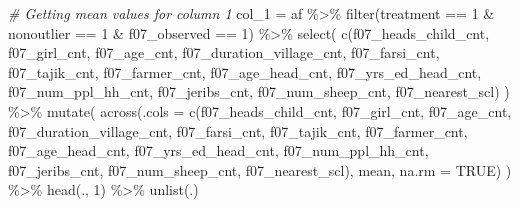 \documentclass[
]{article}
\newenvironment{Shaded}{\begin{snugshade}}{\end{snugshade}}
\newcommand{\AttributeTok}[1]{\textcolor[rgb]{0.77,0.63,0.00}{#1}}
\newcommand{\CommentTok}[1]{\textcolor[rgb]{0.56,0.35,0.01}{\textit{#1}}}
\newcommand{\ConstantTok}[1]{\textcolor[rgb]{0.00,0.00,0.00}{#1}}
\newcommand{\DecValTok}[1]{\textcolor[rgb]{0.00,0.00,0.81}{#1}}
\newcommand{\FunctionTok}[1]{\textcolor[rgb]{0.00,0.00,0.00}{#1}}
\newcommand{\NormalTok}[1]{#1}
\newcommand{\OtherTok}[1]{\textcolor[rgb]{0.56,0.35,0.01}{#1}}
\newcommand{\SpecialCharTok}[1]{\textcolor[rgb]{0.00,0.00,0.00}{#1}}
\begin{document}
\begin{Shaded}
\begin{Highlighting}[]
\CommentTok{\# Getting mean values for column 1}
\NormalTok{col\_1 }\OtherTok{=}\NormalTok{ af }\SpecialCharTok{\%\textgreater{}\%} 
  \FunctionTok{filter}\NormalTok{(treatment }\SpecialCharTok{==} \DecValTok{1} \SpecialCharTok{\&}\NormalTok{ nonoutlier }\SpecialCharTok{==} \DecValTok{1} \SpecialCharTok{\&}\NormalTok{ f07\_observed }\SpecialCharTok{==} \DecValTok{1}\NormalTok{) }\SpecialCharTok{\%\textgreater{}\%} 
  \FunctionTok{select}\NormalTok{(}
    \FunctionTok{c}\NormalTok{(f07\_heads\_child\_cnt, f07\_girl\_cnt, f07\_age\_cnt, f07\_duration\_village\_cnt,}
\NormalTok{                   f07\_farsi\_cnt,  f07\_tajik\_cnt,  f07\_farmer\_cnt, }
\NormalTok{                   f07\_age\_head\_cnt, f07\_yrs\_ed\_head\_cnt, f07\_num\_ppl\_hh\_cnt, f07\_jeribs\_cnt,  }
\NormalTok{                   f07\_num\_sheep\_cnt, f07\_nearest\_scl)}
\NormalTok{  ) }\SpecialCharTok{\%\textgreater{}\%} 
  \FunctionTok{mutate}\NormalTok{(}
  \FunctionTok{across}\NormalTok{(}\AttributeTok{.cols =} \FunctionTok{c}\NormalTok{(f07\_heads\_child\_cnt, f07\_girl\_cnt, f07\_age\_cnt, f07\_duration\_village\_cnt,}
\NormalTok{                   f07\_farsi\_cnt,  f07\_tajik\_cnt,  f07\_farmer\_cnt, }
\NormalTok{                   f07\_age\_head\_cnt, f07\_yrs\_ed\_head\_cnt, f07\_num\_ppl\_hh\_cnt, f07\_jeribs\_cnt, }
\NormalTok{                   f07\_num\_sheep\_cnt, f07\_nearest\_scl), mean, }\AttributeTok{na.rm =} \ConstantTok{TRUE}\NormalTok{)}
\NormalTok{  ) }\SpecialCharTok{\%\textgreater{}\%} \FunctionTok{head}\NormalTok{(., }\DecValTok{1}\NormalTok{) }\SpecialCharTok{\%\textgreater{}\%} \FunctionTok{unlist}\NormalTok{(.)}


\end{Highlighting}
\end{Shaded}
\end{document}
